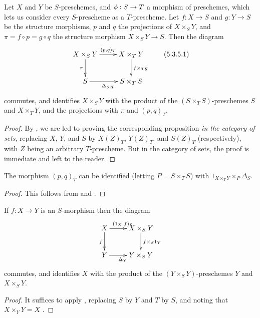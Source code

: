 \begin{prop}[5.3.5]
\label{1.5.3.5}
Let $X$ and $Y$ be $S$-preschemes, and $\vphi:S\to T$ a morphism of preschemes, which lets us consider every $S$-prescheme as a $T$-prescheme.
Let $f:X\to S$ and $g:Y\to S$ be the structure morphisms, $p$ and $q$ the projections of $X\times_S Y$, and $\pi=f\circ p=g\circ q$ the structure morphism $X\times_S Y\to S$.
Then the diagram
\[
  \xymatrix{
    X\times_S Y \ar[r]^{(p,q)_T} \ar[d]_\pi
    & X\times_T Y \ar[d]^{f\times_T g}\\
    S \ar[r]_{\Delta_{S|T}}
    & S\times_T S
  }\tag{5.3.5.1}
\]
commutes, and identifies $X\times_S Y$ with the product of the $(S\times_T S)$-preschemes $S$ and $X\times_T Y$, and the projections with $\pi$ and $(p,q)_T$.
\end{prop}

\begin{proof}
\label{proof-1.5.3.5}
By , we are led to proving the corresponding proposition \emph{in the category of sets}, replacing $X$, $Y$, and $S$ by $X(Z)_T$, $Y(Z)_T$, and $S(Z)_T$ (respectively), with $Z$ being an arbitrary $T$-prescheme.
But in the category of sets, the proof is immediate and left to the reader.
\end{proof}

\begin{cor}[5.3.6]
\label{1.5.3.6}
The morphism $(p,q)_T$ can be identified (letting $P=S\times_T S$) with $1_{X\times_T Y}\times_P\Delta_S$.
\end{cor}

\begin{proof}
\label{proof-1.5.3.6}
This follows from  and .
\end{proof}

\begin{cor}[5.3.7]
\label{1.5.3.7}
If $f:X\to Y$ is an $S$-morphism then the diagram
\[
  \xymatrix{
    X \ar[r]^{(1_X,f)_S} \ar[d]_f
    & X\times_S Y \ar[d]^{f\times_S 1_Y}\\
    Y \ar[r]_{\Delta_Y}
    & Y\times_S Y
  }
\]
commutes, and identifies $X$ with the product of the $(Y\times_S Y)$-preschemes $Y$ and $X\times_S Y$.
\end{cor}

\begin{proof}
\label{proof-1.5.3.7}
It suffices to apply , replacing $S$ by $Y$ and $T$ by $S$, and noting that $X\times_Y Y=X$ .
\end{proof}

